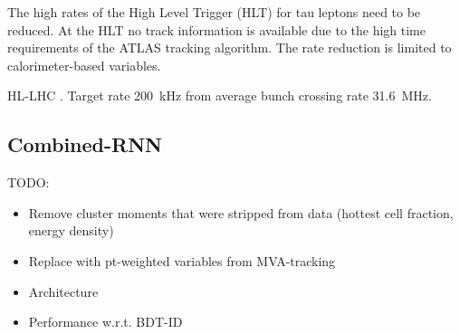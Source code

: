 The high rates of the High Level Trigger (HLT) for tau leptons need to be
reduced. At the HLT no track information is available due to the high time
requirements of the ATLAS tracking algorithm. The rate reduction is limited to
calorimeter-based variables.

HL-LHC \cite{hl_lhc}. Target rate \SI{200}{\kilo\hertz} from average bunch
crossing rate \SI{31.6}{\mega\hertz}.

\subsection{Combined-RNN}
\label{sec:rnn_combined}

TODO:
\begin{itemize}
\item Remove cluster moments that were stripped from data (hottest cell
  fraction, energy density)
\item Replace with pt-weighted variables from MVA-tracking
\end{itemize}

\begin{itemize}
\item Architecture
\item Performance w.r.t. BDT-ID
\end{itemize}


